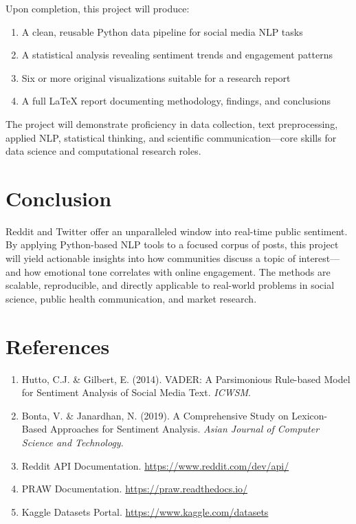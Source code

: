 \documentclass[12pt, letterpaper]{article}
\begin{document}
Upon completion, this project will produce:

\begin{enumerate}
    \item A clean, reusable Python data pipeline for social media NLP tasks
    \item A statistical analysis revealing sentiment trends and engagement patterns
    \item Six or more original visualizations suitable for a research report
    \item A full LaTeX report documenting methodology, findings, and conclusions
\end{enumerate}

The project will demonstrate proficiency in data collection, text preprocessing, applied NLP, statistical thinking, and scientific communication---core skills for data science and computational research roles.

\section{Conclusion}

Reddit and Twitter offer an unparalleled window into real-time public sentiment. By applying Python-based NLP tools to a focused corpus of posts, this project will yield actionable insights into how communities discuss a topic of interest---and how emotional tone correlates with online engagement. The methods are scalable, reproducible, and directly applicable to real-world problems in social science, public health communication, and market research.

\newpage
\section*{References}

\begin{enumerate}
    \item Hutto, C.J. \& Gilbert, E. (2014). VADER: A Parsimonious Rule-based Model for Sentiment Analysis of Social Media Text. \textit{ICWSM}.
    \item Bonta, V. \& Janardhan, N. (2019). A Comprehensive Study on Lexicon-Based Approaches for Sentiment Analysis. \textit{Asian Journal of Computer Science and Technology}.
    \item Reddit API Documentation. \url{https://www.reddit.com/dev/api/}
    \item PRAW Documentation. \url{https://praw.readthedocs.io/}
    \item Kaggle Datasets Portal. \url{https://www.kaggle.com/datasets}
\end{enumerate}
\end{document}
